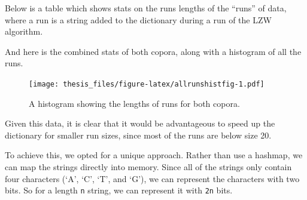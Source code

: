 \documentclass[12pt,twoside]{reedthesis}
\begin{document}
Below is a table which shows stats on the runs lengths of the ``runs'' of data, where a run is a string added to the dictionary during a run of the LZW algorithm.
\begin{table}[H]

\caption{\label{tab:runstatsfig}F}
\centering
{}
\end{table}
\begin{table}[H]

\caption{\label{tab:runstatsfig}F}
\centering
{}
\end{table}
And here is the combined stats of both copora, along with a histogram of all the runs.
\begin{table}[H]

\caption{\label{tab:bothrunsfig}F}
\centering
{}
\end{table}
\begin{figure}
\centering
\texttt{[image: thesis\_files/figure-latex/allrunshistfig-1.pdf]}
\caption{\label{fig:allrunshistfig}A histogram showing the lengths of runs for both copora.}
\end{figure}
Given this data, it is clear that it would be advantageous to speed up the dictionary for smaller run sizes, since most of the runs are below size 20.

To achieve this, we opted for a unique approach. Rather than use a hashmap, we can map the strings directly into memory. Since all of the strings only contain four characters (`A', `C', `T', and `G'), we can represent the characters with two bits. So for a length \texttt{n} string, we can represent it with \texttt{2n} bits.
\end{document}
